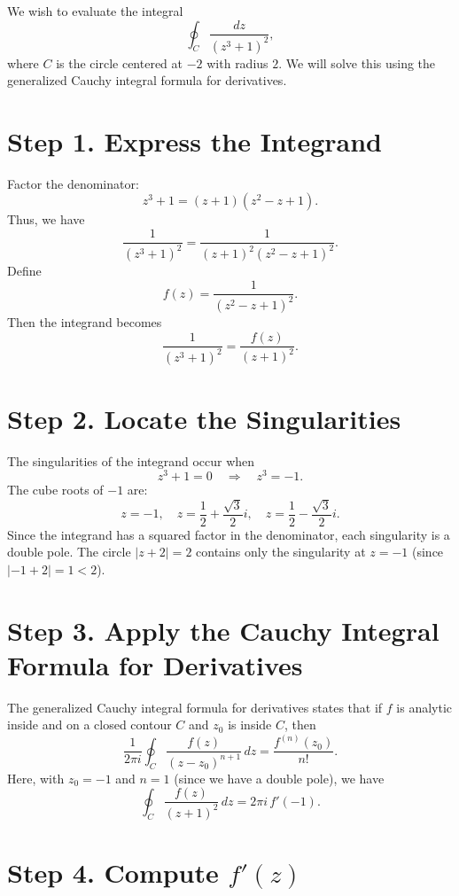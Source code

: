 \documentclass[12pt]{article}
\title{}
\author{Jerich Lee}
\date{\today}
\theoremstyle{definition} %
\theoremstyle{plain} %
\begin{document}
\maketitle
We wish to evaluate the integral
\[
\oint_C \frac{dz}{\left(z^3+1\right)^2},
\]
where \(C\) is the circle centered at \(-2\) with radius \(2\). We will solve this using the generalized Cauchy integral formula for derivatives.

\section*{Step 1. Express the Integrand}

Factor the denominator:
\[
z^3+1 = (z+1)(z^2-z+1).
\]
Thus, we have
\[
\frac{1}{\left(z^3+1\right)^2} = \frac{1}{(z+1)^2 (z^2-z+1)^2}.
\]
Define
\[
f(z) = \frac{1}{\left(z^2-z+1\right)^2}.
\]
Then the integrand becomes
\[
\frac{1}{\left(z^3+1\right)^2} = \frac{f(z)}{(z+1)^2}.
\]

\section*{Step 2. Locate the Singularities}

The singularities of the integrand occur when
\[
z^3+1=0 \quad \Longrightarrow \quad z^3=-1.
\]
The cube roots of \(-1\) are:
\[
z=-1,\quad z=\frac{1}{2}+\frac{\sqrt{3}}{2}i,\quad z=\frac{1}{2}-\frac{\sqrt{3}}{2}i.
\]
Since the integrand has a squared factor in the denominator, each singularity is a double pole. The circle \( |z+2|=2 \) contains only the singularity at \( z=-1 \) (since \( |-1+2| = 1 < 2 \)).

\section*{Step 3. Apply the Cauchy Integral Formula for Derivatives}

The generalized Cauchy integral formula for derivatives states that if \( f \) is analytic inside and on a closed contour \( C \) and \( z_0 \) is inside \( C \), then
\[
\frac{1}{2\pi i}\oint_C \frac{f(z)}{(z-z_0)^{n+1}} \, dz = \frac{f^{(n)}(z_0)}{n!}.
\]
Here, with \( z_0=-1 \) and \( n=1 \) (since we have a double pole), we have
\[
\oint_C \frac{f(z)}{(z+1)^2} \, dz = 2\pi i\, f'(-1).
\]

\section*{Step 4. Compute \( f'(z) \)}
\end{document}
